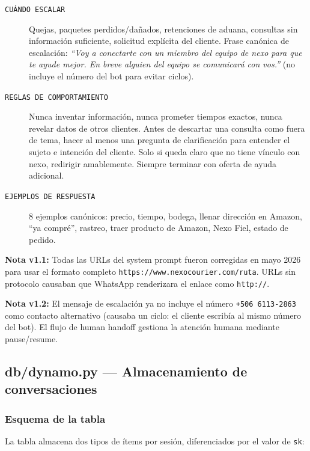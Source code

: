 \documentclass[12pt,a4paper]{article}
\begin{document}
\begin{description}
  \item[\texttt{CUÁNDO ESCALAR}] Quejas, paquetes perdidos/dañados, retenciones de aduana, consultas sin información suficiente, solicitud explícita del cliente. Frase canónica de escalación: \textit{``Voy a conectarte con un miembro del equipo de nexo para que te ayude mejor. En breve alguien del equipo se comunicará con vos.''} (no incluye el número del bot para evitar ciclos).
  \item[\texttt{REGLAS DE COMPORTAMIENTO}] Nunca inventar información, nunca prometer tiempos exactos, nunca revelar datos de otros clientes. Antes de descartar una consulta como fuera de tema, hacer al menos una pregunta de clarificación para entender el sujeto e intención del cliente. Solo si queda claro que no tiene vínculo con nexo, redirigir amablemente. Siempre terminar con oferta de ayuda adicional.
  \item[\texttt{EJEMPLOS DE RESPUESTA}] 8 ejemplos canónicos: precio, tiempo, bodega, llenar dirección en Amazon, ``ya compré'', rastreo, traer producto de Amazon, Nexo Fiel, estado de pedido.
\end{description}

\begin{nexobox}
\textbf{Nota v1.1:} Todas las URLs del system prompt fueron corregidas en mayo 2026 para usar el formato completo \texttt{https://www.nexocourier.com/ruta}. URLs sin protocolo causaban que WhatsApp renderizara el enlace como \texttt{http://}.
\end{nexobox}

\begin{nexobox}
\textbf{Nota v1.2:} El mensaje de escalación ya no incluye el número \texttt{+506 6113-2863} como contacto alternativo (causaba un ciclo: el cliente escribía al mismo número del bot). El flujo de human handoff gestiona la atención humana mediante pause/resume.
\end{nexobox}

\subsection{db/dynamo.py — Almacenamiento de conversaciones}

\subsubsection*{Esquema de la tabla}

La tabla almacena dos tipos de ítems por sesión, diferenciados por el valor de \texttt{sk}:
\end{document}
